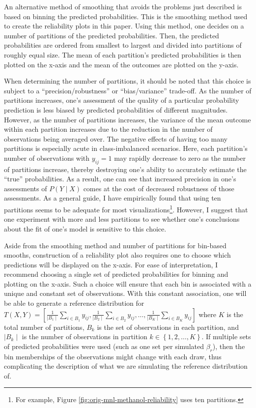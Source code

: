 \documentclass[preprint]{elsarticle}
\begin{document}
An alternative method of smoothing that avoids the problems just described is based on binning the predicted probabilities. This is the smoothing method used to create the reliability plots in this paper. Using this method, one decides on a number of partitions of the predicted probabilities. Then, the predicted probabilities are ordered from smallest to largest and divided into partitions of roughly equal size. The mean of each partition's predicted probabilities is then plotted on the x-axis and the mean of the outcomes are plotted on the y-axis.

When determining the number of partitions, it should be noted that this choice is subject to a ``precision/robustness'' or ``bias/variance'' trade-off. As the number of partitions increases, one's assessment of the quality of a particular probability prediction is less biased by predicted probabilities of different magnitudes. However, as the number of partitions increases, the variance of the mean outcome within each partition increases due to the reduction in the number of observations being averaged over. The negative effects of having too many partitions is especially acute in class-imbalanced scenarios. Here, each partition's number of observations with $y_{ij} = 1$ may rapidly decrease to zero as the number of partitions increase, thereby destroying one's ability to accurately estimate the ``true'' probabilities. As a result, one can see that increased precision in one's assessments of $P \left( Y \mid X \right)$ comes at the cost of decreased robustness of those assessments. As a general guide, I have empirically found that using ten partitions seems to be adequate for most visualizations\footnote{For example, Figure \ref{fig:orig-mnl-methanol-reliability} uses ten partitions.}. However, I suggest that one experiment with more and less partitions to see whether one's conclusions about the fit of one's model is sensitive to this choice.

Aside from the smoothing method and number of partitions for bin-based smooths, construction of a reliability plot also requires one to choose which predictions will be displayed on the x-axis. For ease of interpretation, I recommend choosing a single set of predicted probabilities for binning and plotting on the x-axis. Such a choice will ensure that each bin is associated with a unique and constant set of observations. With this constant association, one will be able to generate a reference distribution for $T \left( X, Y \right) = \left[ \frac{1}{\mid B_1 \mid} \sum _{i \in B_1} y_{ij} , \frac{1}{\mid B_2 \mid} \sum _{i \in B_2} y_{ij}, \dots, \frac{1}{\mid B_K \mid} \sum _{i \in B_K} y_{ij} \right]$ where $K$ is the total number of partitions, $B_k$ is the set of observations in each partition, and $\mid B_k \mid$ is the number of observations in partition $k \in \left\lbrace 1, 2, \dots, K \right\rbrace$. If multiple sets of predicted probabilities were used (such as one set per simulated  $\beta_r$), then the bin memberships of the observations might change with each draw, thus complicating the description of what we are simulating the reference distribution of.
\end{document}
